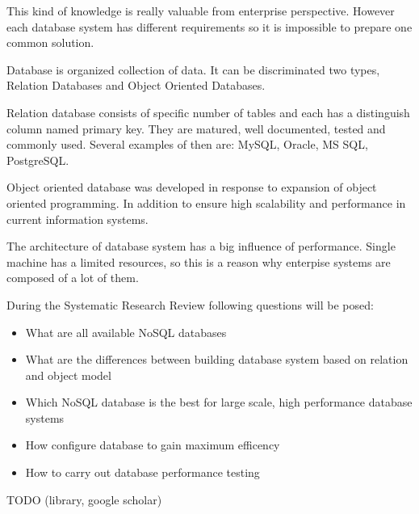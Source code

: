 \documentclass[times, 10pt,twocolumn]{article}
\begin{document}
This kind of knowledge is really valuable from enterprise perspective. However each database
system has different requirements so it is impossible to prepare one common solution.
 

Database is organized collection of data. It can be discriminated two types, 
Relation Databases and Object Oriented Databases.

Relation database consists of specific number of tables and each has a distinguish column named primary key. 
They are matured, well documented, tested and commonly used. Several examples of then are: MySQL, Oracle, MS SQL, PostgreSQL. 

Object oriented database was developed in response to expansion of object oriented programming. In addition to ensure high scalability and  
performance in current information systems.

The architecture of database system has a big influence of performance. Single machine has a limited
resources, so this is a reason why enterpise systems  are composed of a lot of them.



During the Systematic Research Review following questions will be posed: 

\begin{itemize}
  \item What are all available NoSQL databases
  \item What are the differences between building database system based on relation and object model
  \item Which NoSQL database is the best for large scale, high performance database systems
  \item How configure database to gain maximum efficency
  \item How to carry out database performance testing
\end{itemize}


TODO (library, google scholar)



\end{document}
